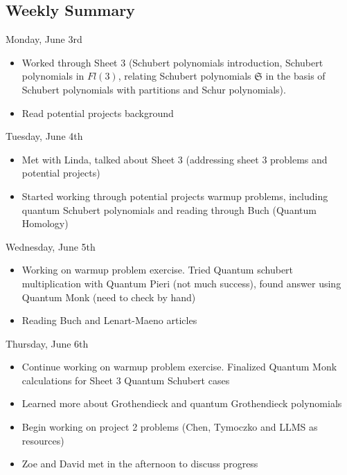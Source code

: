 \subsection{Weekly Summary}

Monday, June 3rd
\begin{itemize}
    \item Worked through Sheet 3 (Schubert polynomials introduction, Schubert polynomials in $Fl(3)$, relating Schubert polynomials $\mathfrak{S}$ in the basis of Schubert polynomials with partitions and Schur polynomials).
    \item Read potential projects background
\end{itemize}

Tuesday, June 4th
\begin{itemize}
    \item Met with Linda, talked about Sheet 3 (addressing sheet 3 problems and potential projects)
    \item Started working through potential projects warmup problems, including quantum Schubert polynomials and reading through Buch (Quantum Homology)
\end{itemize}

Wednesday, June 5th
\begin{itemize}
    \item Working on warmup problem exercise. Tried Quantum schubert multiplication with Quantum Pieri (not much success), found answer using Quantum Monk (need to check by hand)
    \item Reading Buch and Lenart-Maeno articles
\end{itemize}

Thursday, June 6th
\begin{itemize}
    \item Continue working on warmup problem exercise. Finalized Quantum Monk calculations for Sheet 3 Quantum Schubert cases
    \item Learned more about Grothendieck and quantum Grothendieck polynomials
    \item Begin working on project 2 problems (Chen, Tymoczko and LLMS as resources)
    \item Zoe and David met in the afternoon to discuss progress
\end{itemize}

